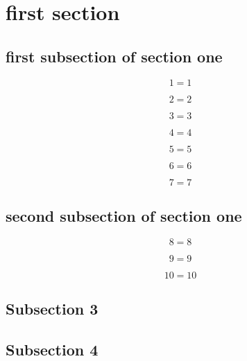 \documentclass[a4paper, 11pt]{article}
\numberwithin{equation}{subsection}
\begin{document}
\section{first section}

\subsection{first subsection of section one}

\begin{equation}
    1=1
\end{equation}

\begin{equation}
    2=2
\end{equation}

\begin{equation}
    3=3
\end{equation}

\begin{equation}
    4=4
\end{equation}

\begin{equation}
    5=5
\end{equation}

\begin{equation}
    6=6
\end{equation}

\begin{equation}
    7=7
\end{equation}

\subsection{second subsection of section one}

\begin{equation}
    8=8
\end{equation}

\begin{equation}
    9=9
\end{equation}

\begin{equation}
    10=10
\end{equation}

\subsection{Subsection 3}

\subsection{Subsection 4}
\end{document}
